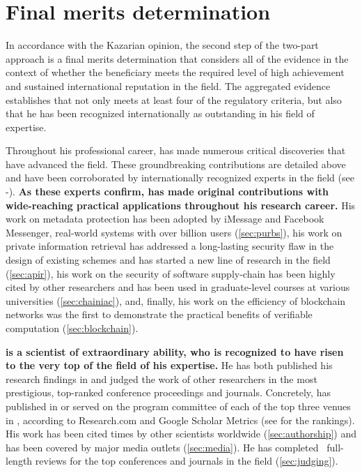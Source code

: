 \section{Final merits determination}
\label{sec:merits}

In accordance with the Kazarian opinion, the second step of the two-part
approach is a final merits determination that considers all of the evidence in
the context of whether the beneficiary meets the required level of high
achievement and sustained international reputation in the field.
The aggregated evidence establishes that \dr not only meets at least four of the
regulatory criteria, but also that he has been recognized internationally as
outstanding in his field of expertise.

Throughout his professional career, \dr has made numerous critical discoveries
that have advanced the field. These groundbreaking contributions are detailed
above and have been corroborated by internationally recognized experts in the
field (see -).
\textbf{As these experts confirm, \dr has made original contributions with 
wide-reaching practical applications throughout his research career.}
His work on metadata protection has been adopted by iMessage
and Facebook Messenger, real-world systems with over billion
users (\cref{sec:purbs}), 
his work on private information retrieval has addressed a long-lasting security
flaw in the design of existing schemes and has started a new line of research in
the field (\cref{sec:apir}),
his work on the security of software supply-chain has been highly cited by other
researchers and has been used in graduate-level courses at various
universities (\cref{sec:chainiac}),
and, finally, his work on the efficiency of blockchain networks was the first to
demonstrate the practical benefits of verifiable computation
(\cref{sec:blockchain}).

\textbf{\dr is a scientist of extraordinary ability, who is recognized to have risen to the very top of the field of his expertise.}
He has both published his research findings in and judged the work of other
researchers in the most prestigious, top-ranked conference proceedings and
journals.
Concretely, \dr has published in or served on the program committee of
each of the top three venues in \dpcs, according to Research.com and Google
Scholar Metrics (see  for the rankings).
His work has been cited \numcitations times by other scientists worldwide
(\cref{sec:authorship}) and has been covered by major media outlets
(\cref{sec:media}).
He has completed \numreviews~full-length reviews for
the top conferences and journals in the field (\cref{sec:judging}).

